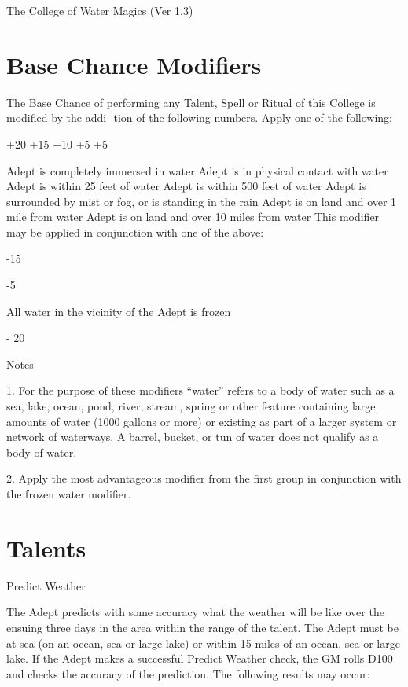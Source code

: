 \begin{Chapter}{The College of Water Magics (Ver 1.3)}
\section{Base Chance Modifiers}

The  Base  Chance  of  performing  any  Talent,  Spell 
or  Ritual  of  this  College  is  modified  by  the  addi-
tion  of  the  following  numbers.  Apply  one  of  the 
following: 

+20 
+15 
+10 
+5 
+5  

Adept is completely immersed in water 
Adept is in physical contact with water 
Adept is within 25 feet of water 
Adept is within 500 feet of water 
Adept is surrounded by mist or fog, or is 
standing in the rain 
Adept is on land and over 1 mile from 
water 
Adept is on land and over 10 miles from 
water 
This  modifier  may  be  applied  in  conjunction  with 
one of the above: 

-15 

-5 

All  water  in  the  vicinity  of  the  Adept  is 
frozen 

-
20 

Notes 

1. For the purpose of these modifiers “water” refers 
to a body of water such as a sea, lake, ocean, pond, 
river,  stream,  spring  or  other  feature  containing 
large  amounts  of  water  (1000  gallons  or  more)  or 
existing  as  part  of  a  larger  system  or  network  of 
waterways.  A  barrel,  bucket,  or  tun  of  water  does 
not qualify as a body of water. 

2. Apply the most advantageous modifier from the 
first  group  in  conjunction  with  the  frozen  water 
modifier. 


\section{Talents}

\begin{talent}[T-1]{Predict Weather }

\begin{effects}
 The  Adept  predicts  with  some  accuracy 
what  the  weather  will  be  like  over  the  ensuing 
three days in the area within the range of the talent. 
The Adept must be at sea (on an ocean, sea or large 
lake)  or  within  15  miles  of  an  ocean,  sea  or  large 
lake.  If  the  Adept  makes  a  successful  Predict 
Weather check, the GM rolls D100 and checks the 
accuracy  of  the  prediction.  The  following  results 
may occur: 


\end{effects}
\end{talent}
\end{Chapter}
